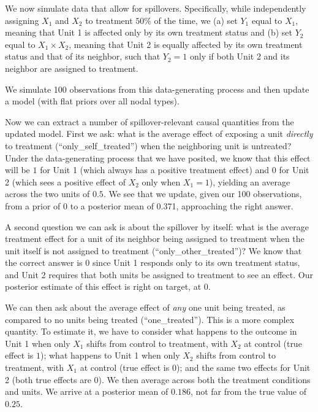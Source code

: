 \documentclass[
  12pt,
]{book}
\begin{document}
We now simulate data that allow for spillovers. Specifically, while independently assigning \(X_1\) and \(X_2\) to treatment \(50 \%\) of the time, we (a) set \(Y_1\) equal to \(X_1\), meaning that Unit 1 is affected only by its own treatment status and (b) set \(Y_2\) equal to \(X_1 \times X_2\), meaning that Unit 2 is equally affected by its own treatment status and that of its neighbor, such that \(Y_2 = 1\) only if both Unit 2 and its neighbor are assigned to treatment.

We simulate 100 observations from this data-generating process and then update a model (with flat priors over all nodal types).

Now we can extract a number of spillover-relevant causal quantities from the updated model. First we ask: what is the average effect of exposing a unit \emph{directly} to treatment (``only\_self\_treated'') when the neighboring unit is untreated? Under the data-generating process that we have posited, we know that this effect will be \(1\) for Unit 1 (which always has a positive treatment effect) and \(0\) for Unit 2 (which sees a positive effect of \(X_2\) only when \(X_1 = 1\)), yielding an average across the two units of \(0.5\). We see that we update, given our 100 observations, from a prior of 0 to a posterior mean of 0.371, approaching the right answer.

A second question we can ask is about the spillover by itself: what is the average treatment effect for a unit of its neighbor being assigned to treatment when the unit itself is not assigned to treatment (``only\_other\_treated'')? We know that the correct answer is \(0\) since Unit 1 responds only to its own treatment status, and Unit 2 requires that both units be assigned to treatment to see an effect. Our posterior estimate of this effect is right on target, at 0.

We can then ask about the average effect of \emph{any} one unit being treated, as compared to no units being treated (``one\_treated''). This is a more complex quantity. To estimate it, we have to consider what happens to the outcome in Unit 1 when only \(X_1\) shifts from control to treatment, with \(X_2\) at control (true effect is \(1\)); what happens to Unit 1 when only \(X_2\) shifts from control to treatment, with \(X_1\) at control (true effect is \(0\)); and the same two effects for Unit 2 (both true effects are \(0\)). We then average across both the treatment conditions and units. We arrive at a posterior mean of \(0.186\), not far from the true value of \(0.25\).
\end{document}
